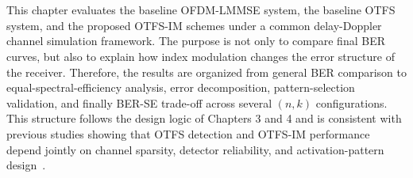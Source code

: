 \section*{}

\setcounter{section}{5}
\setcounter{subsection}{0}
\setcounter{subsubsection}{0}
\setcounter{figure}{0}
\setcounter{table}{0}
\setcounter{equation}{0}

\renewcommand{\thefigure}{5.\arabic{figure}}
\renewcommand{\thetable}{5.\arabic{table}}
\renewcommand{\theequation}{5.\arabic{equation}}
\renewcommand{\theHfigure}{5.\arabic{figure}}
\renewcommand{\theHtable}{5.\arabic{table}}
\renewcommand{\theHequation}{5.\arabic{equation}}

This chapter evaluates the baseline OFDM-LMMSE system, the baseline OTFS system, and the proposed OTFS-IM schemes under a common delay-Doppler channel simulation framework. The purpose is not only to compare final BER curves, but also to explain how index modulation changes the error structure of the receiver. Therefore, the results are organized from general BER comparison to equal-spectral-efficiency analysis, error decomposition, pattern-selection validation, and finally BER-SE trade-off across several \((n,k)\) configurations. This structure follows the design logic of Chapters 3 and 4 and is consistent with previous studies showing that OTFS detection and OTFS-IM performance depend jointly on channel sparsity, detector reliability, and activation-pattern design~\cite{Raviteja2018OTFSMP,Wu2024OTFSIMDetector,Liang2020OTFSIM}.















\newpage
